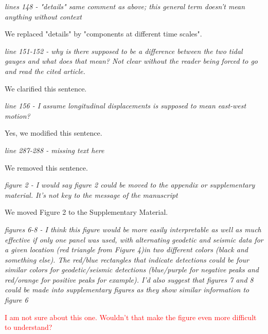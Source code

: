 \documentclass[letterpaper, 12pt]{article}
\begin{document}
\bigskip

\textit{lines 148 - "details" same comment as above; this general term doesn't mean anything without context}

\bigskip

We replaced "details" by "components at different time scales".

\bigskip

\textit{line 151-152 - why is there supposed to be a difference between the two tidal gauges and what does that mean? Not clear without the reader being forced to go and read the cited article.}

\bigskip

We clarified this sentence.

\bigskip

\textit{line 156 - I assume longitudinal displacements is supposed to mean east-west motion?}

\bigskip

Yes, we modified this sentence.

\bigskip

\textit{line 287-288 - missing text here}

\bigskip

We removed this sentence.

\bigskip

\textit{figure 2 - I would say figure 2 could be moved to the appendix or supplementary material. It's not key to the message of the manuscript}

\bigskip

We moved Figure 2 to the Supplementary Material.

\bigskip

\textit{figures 6-8 - I think this figure would be more easily interpretable as well as much effective if only one panel was used, with alternating geodetic and seismic data for a given location (red triangle from Figure 4)in two different colors (black and something else). The red/blue rectangles that indicate detections could be four similar colors for geodetic/seismic detections (blue/purple for negative peaks and red/orange for positive peaks for example). I'd also suggest that figures 7 and 8 could be made into supplementary figures as they show similar information to figure 6}

\bigskip

\textcolor{red}{I am not sure about this one. Wouldn't that make the figure even more difficult to understand?}

\bigskip
\end{document}
